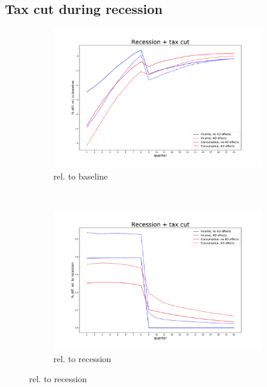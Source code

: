 \documentclass[]{article}
\begin{document}
\FloatBarrier
\subsection{Tax cut during recession}


\begin{figure}
	\centering
	\begin{subfigure}[b]{\textwidth}
		\centering
		\includegraphics[width=\linewidth]{../full_run/recession_taxcut_relbaseline}
		\caption{rel. to baseline}
		\label{fig:recessiontaxcutrelbaseline}
	\end{subfigure}\\
	\hfill
	\begin{subfigure}[b]{\textwidth}
	\centering
	\includegraphics[width=\linewidth]{../full_run/recession_taxcut_relrecession}
	\caption{rel. to recession}
	\label{fig:recessiontaxcutrelrecession}
	\end{subfigure}
\end{figure}
\end{document}
